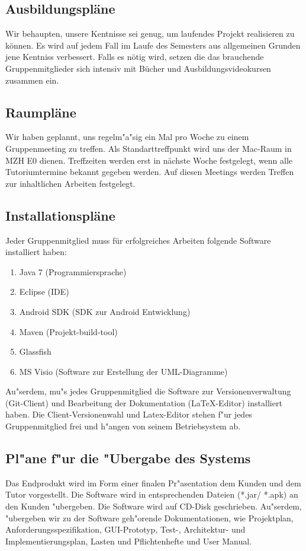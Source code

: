 \documentclass[fontsize=12pt,paper=a4,twoside]{scrartcl}
\begin{document}
\subsection{Ausbildungspläne}
Wir behaupten, unsere Kentnisse sei genug, um laufendes Projekt realisieren zu können. Es wird auf jedem Fall im Laufe des Semesters aus allgemeinen Grunden jene Kentniss verbessert. Falls es nötig wird, setzen die das brauchende Gruppenmitglieder sich intensiv mit Bücher und Ausbildungsvideokursen zusammen ein.

\subsection{Raumpläne}
Wir haben geplannt, uns regelm"a"sig ein Mal pro Woche zu einem Gruppenmeeting zu treffen. Als Standarttreffpunkt wird uns der Mac-Raum in MZH E0 dienen. Treffzeiten werden erst in nächste Woche festgelegt, wenn alle Tutoriumtermine bekannt gegeben werden. Auf diesen Meetings werden Treffen zur inhaltlichen Arbeiten festgelegt. 

\subsection{Installationspläne}

Jeder Gruppenmitglied muss für erfolgreiches Arbeiten folgende Software installiert haben:
\begin{enumerate}
 \item Java 7 (Programmiersprache)
 \item Eclipse (IDE)
 \item Android SDK (SDK zur Android Entwicklung)
 \item Maven (Projekt-build-tool)
 \item Glassfish 
 \item MS Visio (Software zur Erstellung der UML-Diagramme)
\end{enumerate}
Au"serdem, mu"s jedes Gruppenmitglied die Software zur Versionenverwaltung (Git-Client) und Bearbeitung der Dokumentation (LaTeX-Editor) installiert haben. Die Client-Versionenwahl und Latex-Editor stehen f"ur jedes Gruppenmitglied frei und h"angen von seinem Betriebsystem ab.

\subsection{Pl"ane f"ur die "Ubergabe des Systems}
Das Endprodukt wird im Form einer finalen Pr"asentation dem Kunden und dem Tutor vorgestellt.
Die Software wird in entsprechenden Dateien (*.jar/ *.apk) an den Kunden "ubergeben. Die Software wird auf CD-Disk geschrieben. Au"serdem, "ubergeben wir zu der Software geh"orende Dokumentationen, wie Projektplan, Anforderungsspezifikation, GUI-Prototyp, Test-, Architektur- und Implementierungsplan, Lasten und Pflichtenhefte und User Manual.
\end{document}
